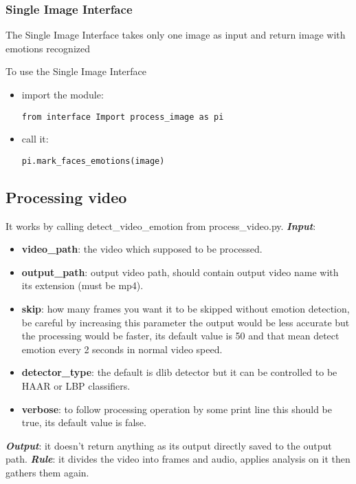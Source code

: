 \subsubsection{Single Image Interface}

The Single Image Interface takes only one image as input and return image
with emotions recognized 

\noindent To use the Single Image Interface 
\begin{itemize}
\item import the module:
\begin{verbatim}
from interface Import process_image as pi
\end{verbatim}
\item call it:
\begin{verbatim}
pi.mark_faces_emotions(image)
\end{verbatim}
\end{itemize}
\newpage

\subsection{Processing video}
It works by calling detect\_video\_emotion from process\_video.py.
\newline \textbf{\textit{Input}}: 
\begin{itemize}
\item  \textbf{video\_path}: the video which supposed to be processed.
\item  \textbf{output\_path}: output video path, should contain output video name with its extension (must be mp4).
\item  \textbf{skip}: how many frames you want it to be skipped without emotion detection, be careful by increasing this parameter the output would be less accurate but the processing would be faster, its default value is 50 and that mean detect emotion every 2 seconds in normal video speed.
\item \textbf{detector\_type}: the default is dlib detector but it can be controlled to be HAAR or LBP classifiers.
\item  \textbf{verbose}: to follow processing operation by some print line this should be true, its default value is false.
\end{itemize}
\textbf{\textit{Output}}: it doesn't return anything as its output directly saved to the output path.
\newline\textbf{\textit{ Rule}}: it divides the video into frames and audio, applies analysis on it then gathers them again.
\newline 
